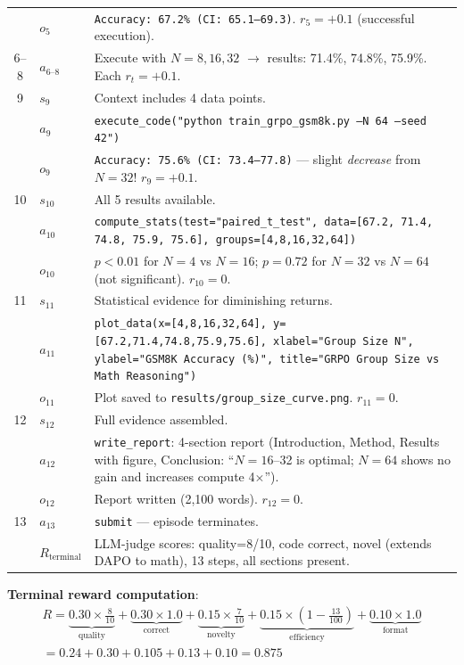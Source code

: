 \begin{examplebox}
{\begin{tabular}{@{}cp{2.2cm}p{10.5cm}@{}}
 & $o_5$ & \texttt{Accuracy: 67.2\% (CI: 65.1--69.3)}. $r_5 = +0.1$ (successful execution). \\
6--8 & $a_{6\text{--}8}$ & Execute with $N=8, 16, 32$ $\to$ results: 71.4\%, 74.8\%, 75.9\%. Each $r_t = +0.1$. \\
9 & $s_9$ & Context includes 4 data points. \\
 & $a_9$ & \texttt{execute\_code("python train\_grpo\_gsm8k.py --N 64 --seed 42")} \\
 & $o_9$ & \texttt{Accuracy: 75.6\% (CI: 73.4--77.8)} --- slight \emph{decrease} from $N=32$! $r_9 = +0.1$. \\
10 & $s_{10}$ & All 5 results available. \\
 & $a_{10}$ & \texttt{compute\_stats(test="paired\_t\_test", data=[67.2, 71.4, 74.8, 75.9, 75.6], groups=[4,8,16,32,64])} \\
 & $o_{10}$ & $p < 0.01$ for $N=4$ vs $N=16$; $p = 0.72$ for $N=32$ vs $N=64$ (not significant). $r_{10} = 0$. \\
11 & $s_{11}$ & Statistical evidence for diminishing returns. \\
 & $a_{11}$ & \texttt{plot\_data(x=[4,8,16,32,64], y=[67.2,71.4,74.8,75.9,75.6], xlabel="Group Size N", ylabel="GSM8K Accuracy (\%)", title="GRPO Group Size vs Math Reasoning")} \\
 & $o_{11}$ & Plot saved to \texttt{results/group\_size\_curve.png}. $r_{11} = 0$. \\
12 & $s_{12}$ & Full evidence assembled. \\
 & $a_{12}$ & \texttt{write\_report}: 4-section report (Introduction, Method, Results with figure, Conclusion: ``$N=16$--32 is optimal; $N=64$ shows no gain and increases compute 4$\times$''). \\
 & $o_{12}$ & Report written (2,100 words). $r_{12} = 0$. \\
13 & $a_{13}$ & \texttt{submit} --- episode terminates. \\
 & $R_{\text{terminal}}$ & LLM-judge scores: quality=8/10, code correct, novel (extends DAPO to math), 13 steps, all sections present. \\
\bottomrule
\end{tabular}
}

\textbf{Terminal reward computation}: 
\begin{multline*}
R = \underbrace{0.30 \times \tfrac{8}{10}}_{\text{quality}} + \underbrace{0.30 \times 1.0}_{\text{correct}} + \underbrace{0.15 \times \tfrac{7}{10}}_{\text{novelty}} + \underbrace{0.15 \times (1 - \tfrac{13}{100})}_{\text{efficiency}} + \underbrace{0.10 \times 1.0}_{\text{format}} \\
= 0.24 + 0.30 + 0.105 + 0.13 + 0.10 = \mathbf{0.875}
\end{multline*}


\end{examplebox}
